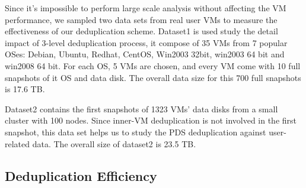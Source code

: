 

Since it's impossible to perform large scale analysis without affecting the VM performance,
we sampled two data sets from real user VMs to measure the effectiveness of our deduplication scheme.
Dataset1 is used study the detail impact of 3-level deduplication process,
it compose of 35 VMs from 7 popular OSes: 
Debian, Ubuntu, Redhat, CentOS, Win2003 32bit, win2003 64 bit and win2008 64 bit. For each OS, 
5 VMs are chosen, and every VM come with 10 full snapshots of it OS and data disk. 
The overall data size for this 700 full snapshots is 17.6 TB.

Dataset2 contains the first snapshots of 1323 VMs' data disks from a small cluster with 100 nodes. 
Since inner-VM deduplication is not involved in the first snapshot, this data set helps us to 
study the PDS deduplication against user-related data. The overall size of dataset2 is 23.5 TB.


\subsection{Deduplication Efficiency}



